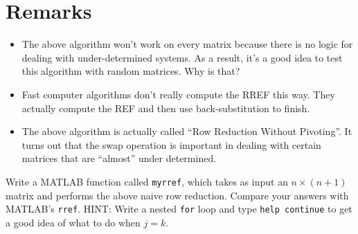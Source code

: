 \section*{Remarks}

\begin{itemize}
\item The above algorithm won't work on every matrix because there is
no logic for dealing with under-determined systems. As a result,
it's a good idea to test this algorithm with random matrices. Why is
that?
\item Fast computer algorithms don't really compute the RREF this
way. They actually compute the REF and then use back-substitution to
finish.
\item The above algorithm is actually called ``Row Reduction Without
Pivoting''. It turns out that the swap operation is important in
dealing with certain matrices that are ``almost'' under determined.
\end{itemize}

\begin{problem}
Write a MATLAB function called {\tt myrref}, which takes as
input an $n\times (n+1)$ matrix and performs the above naive row
reduction. Compare your answers with MATLAB's {\tt rref}. HINT:
Write a nested {\tt for} loop and type {\tt help continue} to get a
good idea of what to do when $j=k$.
\end{problem}
